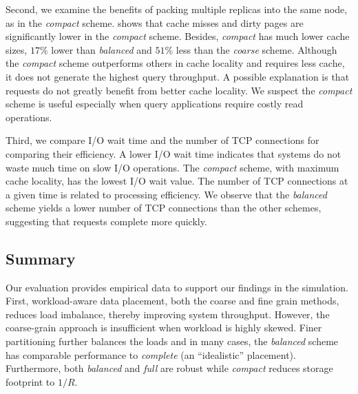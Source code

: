 


Second, we examine the benefits of packing multiple replicas into the same node,
as in the \emph{compact} scheme.
\mytable{\ref{tab:micro_nfs}} shows that cache misses and dirty pages
are significantly lower in the \emph{compact} scheme.
Besides, \emph{compact} has much lower cache sizes, $17\%$ lower than
\emph{balanced} and $51\%$ less than the \emph{coarse} scheme.
Although the \emph{compact} scheme outperforms others in cache locality and
requires less cache,
it does not generate the highest query throughput.
A possible explanation is that requests do not greatly benefit from better cache locality.
We suspect the \emph{compact} scheme is useful especially when query applications
require costly read operations.

Third, we compare I/O wait time and the number of TCP connections
for comparing their efficiency.
A lower I/O wait time indicates that systems do not waste much time on slow I/O operations.
The \emph{compact} scheme, with maximum cache locality, has the lowest I/O wait value.
The number of TCP connections at a given time is related to processing efficiency.
We observe that the \emph{balanced} scheme yields a lower number of TCP connections
than the other schemes, suggesting that requests complete more quickly.


\subsection{Summary}
Our evaluation provides empirical data to support our findings
in the simulation.
First, workload-aware data placement, both the coarse and fine grain methods,
reduces load imbalance, thereby improving system throughput.
However, the coarse-grain approach is insufficient
when workload is highly skewed.
Finer partitioning further balances the loads and in many cases,
the \emph{balanced} scheme has comparable performance to \emph{complete}
(an ``idealistic'' placement).
Furthermore, both \emph{balanced} and \emph{full} are robust while
\emph{compact} reduces storage footprint to $1/R$. 


